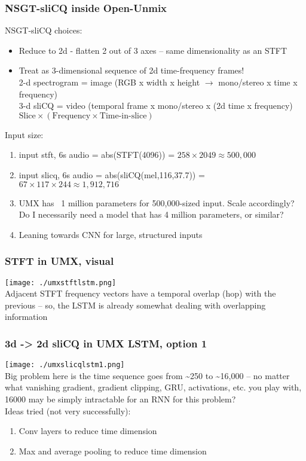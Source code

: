 \documentclass[usenames,dvipsnames]{beamer}
\begin{document}
\begin{frame}
	\frametitle{NSGT-sliCQ inside Open-Unmix}
	NSGT-sliCQ choices:
	\begin{itemize}
		\item
			Reduce to 2d - flatten 2 out of 3 axes -- same dimensionality as an STFT
		\item
			Treat as 3-dimensional sequence of 2d time-frequency frames!\\
			2-d spectrogram = image (RGB x width x height $\rightarrow$ mono/stereo x time x frequency)\\
			3-d sliCQ = video (temporal frame x mono/stereo x (2d time x frequency)\\
			$\text{Slice} \times (\text{Frequency} \times \text{Time-in-slice})$
	\end{itemize}
	Input size:
	\begin{enumerate}
		\item
			input stft, 6s audio = abs(STFT(4096)) = $258 \times 2049 \approx 500,000$
		\item
			input slicq, 6s audio = abs(sliCQ(mel,116,37.7)) = $67 \times 117 \times 244 \approx 1,912,716$
		\item
			UMX has ~1 million parameters for 500,000-sized input. Scale accordingly? Do I necessarily need a model that has 4 million parameters, or similar?
		\item
			Leaning towards CNN for large, structured inputs
	\end{enumerate}
\end{frame}

\begin{frame}
	\frametitle{STFT in UMX, visual}
	\texttt{[image: ./umxstftlstm.png]}\\
	Adjacent STFT frequency vectors have a temporal overlap (hop) with the previous -- so, the LSTM is already somewhat dealing with overlapping information
\end{frame}


\begin{frame}
	\frametitle{3d -> 2d sliCQ in UMX LSTM, option 1}
	\texttt{[image: ./umxslicqlstm1.png]}\\
	Big problem here is the time sequence goes from \textasciitilde 250 to \textasciitilde 16,000 -- no matter what vanishing gradient, gradient clipping, GRU, activations, etc. you play with, 16000 may be simply intractable for an RNN for this problem?\\
	Ideas tried (not very successfully):
	\begin{enumerate}
		\item
			Conv layers to reduce time dimension
		\item
			Max and average pooling to reduce time dimension
	\end{enumerate}
\end{frame}
\end{document}
